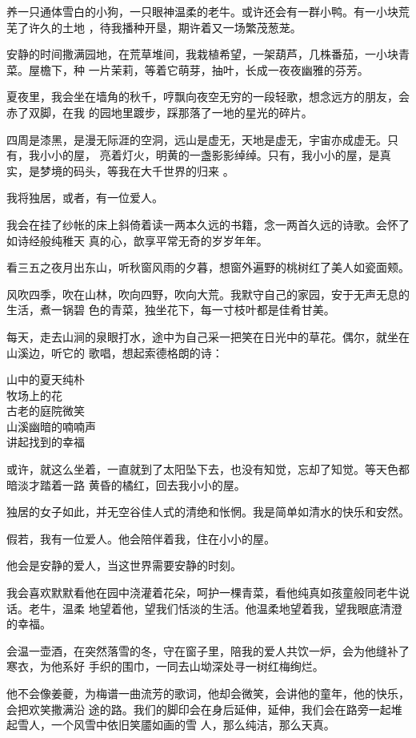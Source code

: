 \documentclass[12pt,a4paper]{article}
\begin{document}
		养一只通体雪白的小狗，一只眼神温柔的老牛。或许还会有一群小鸭。有一小块荒芜了许久的土地
	，待我播种开垦，期许着又一场繁茂葱茏。

		安静的时间撒满园地，在荒草堆间，我栽植希望，一架葫芦，几株番茄，一小块青菜。屋檐下，种
	一片茉莉，等着它萌芽，抽叶，长成一夜夜幽雅的芬芳。

		夏夜里，我会坐在墙角的秋千，哼飘向夜空无穷的一段轻歌，想念远方的朋友，会赤了双脚，在我
	的园地里踱步，踩那落了一地的星光的碎片。

		四周是漆黑，是漫无际涯的空洞，远山是虚无，天地是虚无，宇宙亦成虚无。只有，我小小的屋，
	亮着灯火，明黄的一盏影影绰绰。只有，我小小的屋，是真实，是梦境的码头，等我在大千世界的归来
	。

		我将独居，或者，有一位爱人。

		我会在挂了纱帐的床上斜倚着读一两本久远的书籍，念一两首久远的诗歌。会怀了如诗经般纯稚天
	真的心，歆享平常无奇的岁岁年年。

		看三五之夜月出东山，听秋窗风雨的夕暮，想窗外遍野的桃树红了美人如瓷面颊。

		风吹四季，吹在山林，吹向四野，吹向大荒。我默守自己的家园，安于无声无息的生活，煮一锅碧
	色的青菜，独坐花下，每一寸枝叶都是佳肴甘美。

		每天，走去山涧的泉眼打水，途中为自己采一把笑在日光中的草花。偶尔，就坐在山溪边，听它的
	歌唱，想起索德格朗的诗：

		\longpoem{}{}{}
		山中的夏天纯朴 \\
		牧场上的花 \\
		古老的庭院微笑 \\
		山溪幽暗的喃喃声 \\
		讲起找到的幸福
		\endlongpoem

		或许，就这么坐着，一直就到了太阳坠下去，也没有知觉，忘却了知觉。等天色都暗淡才踏着一路
	黄昏的橘红，回去我小小的屋。

		独居的女子如此，并无空谷佳人式的清绝和怅惘。我是简单如清水的快乐和安然。

		假若，我有一位爱人。他会陪伴着我，住在小小的屋。\par
		他会是安静的爱人，当这世界需要安静的时刻。

		我会喜欢默默看他在园中浇灌着花朵，呵护一棵青菜，看他纯真如孩童般同老牛说话。老牛，温柔
	地望着他，望我们恬淡的生活。他温柔地望着我，望我眼底清澄的幸福。

		会温一壶酒，在突然落雪的冬，守在窗子里，陪我的爱人共饮一炉，会为他缝补了寒衣，为他系好
	手织的围巾，一同去山坳深处寻一树红梅绚烂。

		他不会像姜夔，为梅谱一曲流芳的歌词，他却会微笑，会讲他的童年，他的快乐，会把欢笑撒满沿
	途的路。我们的脚印会在身后延伸，延伸，我们会在路旁一起堆起雪人，一个风雪中依旧笑靥如画的雪
	人，那么纯洁，那么天真。
\end{document}
